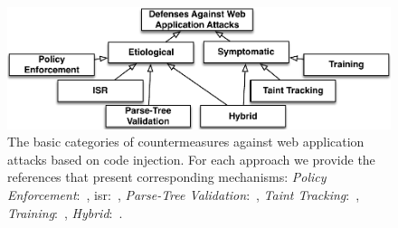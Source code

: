 \documentclass[10pt,journal,compsoc]{IEEEtran}
\begin{document}
\begin{figure}[t]
\begin{center}
\leavevmode
\includegraphics[scale=0.50]{defenses.pdf}
\end{center}
\vspace{-5.8mm}
\caption{\label{fig:defenses}The basic categories of countermeasures
against web application attacks based on code
injection. For each approach we provide the references
that present corresponding mechanisms:
{\it Policy Enforcement}:~\cite{NSS06,JKK06a,KJKV09,TNH07,RDWDE07,YCIS07,OWVS08,PSC09,ML10,DDHPJ10,PS11,VDDPJ11,BV08,SSM10},
{\sc isr}:~\cite{BK04,JB07,GC09,APKLM10},
{\it Parse-Tree Validation}:~\cite{BWS05,SW06},
{\it Taint Tracking}:~\cite{HCF05,PB05,XBS06,NLC07,VFJKKV07,PMP11,SLMS14},
{\it Training}:~\cite{LLW02,HO05b,VMV05,JEP08,WPLKK09,MS09,MKLS11},
{\it Hybrid}:~\cite{BV08,LV09,SMS13,HBBS14,SYMRHKM14,BCJPST15,CVMA07,GLSTMMR12,CPSPBCCSL12}.}
\vspace{-5.5mm}
\end{figure}
\end{document}
